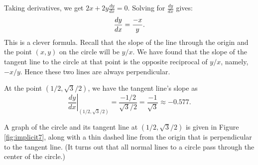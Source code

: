 {%
Taking derivatives, we get $2x+2y\frac{dy}{dx}=0$.  Solving for $\frac{dy}{dx}$  gives: $$\displaystyle \frac{dy}{dx} = \frac{-x}{y}.$$ 
This is a clever formula. Recall that the slope of the line through the origin and the point $(x,y)$ on the circle will be $y/x$. We have found that the slope of the tangent line to the circle at that point is the opposite reciprocal of $y/x$, namely, $-x/y$. Hence these two lines are always perpendicular.

At the point $(1/2, \sqrt{3}/2)$, we have the tangent line's slope as
$$\left.\frac{dy}{dx}\right|_{(1/2, \sqrt{3}/2)} = \frac{-1/2}{\sqrt{3}/2} = \frac{-1}{\sqrt{3}} \approx -0.577.$$

A graph of the circle and its tangent line at $(1/2,\sqrt{3}/2)$ is given in Figure \ref{fig:implicit7}, along with a thin dashed line from the origin that is perpendicular to the tangent line. (It turns out that all normal lines to a circle pass through the center of the circle.)
}\\





